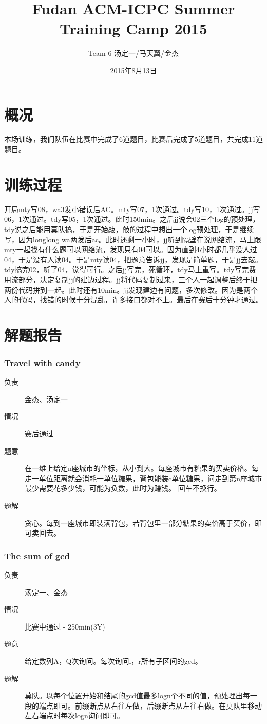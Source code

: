 \documentclass[a4paper, 11pt, nofonts, nocap, fancyhdr]{ctexart}
\title{Fudan ACM-ICPC Summer Training Camp 2015}
\author{Team 6 汤定一/马天翼/金杰}
\date{2015年8月13日}
\newcommand{\problem}[1]{\subsubsection{#1}}
\begin{document}
\maketitle

\section{概况}

本场训练，我们队伍在比赛中完成了6道题目，比赛后完成了5道题目，共完成11道题目。

\section{训练过程}

开局mty写08，wa3发小错误后AC。mty写07，1次通过。tdy写10，1次通过。jj写06，1次通过。tdy写05，1次通过。此时150min。之后jj说会02三个log的预处理，tdy说之后能用莫队搞，于是开始敲，敲的过程中想出一个log预处理，于是继续写，因为longlong wa两发后ac。此时还剩一小时，jj听到隔壁在说网络流，马上跟mty一起找有什么题可以网络流，发现只有04可以。因为直到4小时都几乎没人过04，于是没有人读04。于是mty读04，把题意告诉jj，发现是简单题，于是jj去敲。tdy搞完02，听了04，觉得可行。之后jj写完，死循环，tdy马上重写。tdy写完费用流部分，决定复制jj的建边过程。jj将代码复制过来，三个人一起调整后终于把两份代码拼到一起。此时还有10min。jj发现建边有问题，多次修改。因为是两个人的代码，找错的时候十分混乱，许多接口都对不上。最后在赛后十分钟才通过。

\section{解题报告}

\problem{Travel with candy}

\begin{description}
\item[负责] 金杰、汤定一
\item[情况] 赛后通过
\item[题意]
在一维上给定n座城市的坐标，从小到大。每座城市有糖果的买卖价格。每走一单位距离就会消耗一单位糖果，背包能装c单位糖果，问走到第n座城市最少需要花多少钱，可能为负数，此时为赚钱。
回车不换行。
\item[题解]
贪心。每到一座城市即装满背包，若背包里一部分糖果的卖价高于买价，即可卖回去。
\end{description}

\problem{The sum of gcd}

\begin{description}
\item[负责] 汤定一、金杰
\item[情况] 比赛中通过 - 250min(3Y)
\item[题意]
给定数列A，Q次询问。每次询问l，r所有子区间的gcd。
\item[题解]
莫队。以每个位置开始和结尾的gcd值最多logn个不同的值，预处理出每一段的端点即可。前缀断点从右往左做，后缀断点从左往右做。在莫队里移动左右端点时每次logn询问即可。
\end{description}
\end{document}
